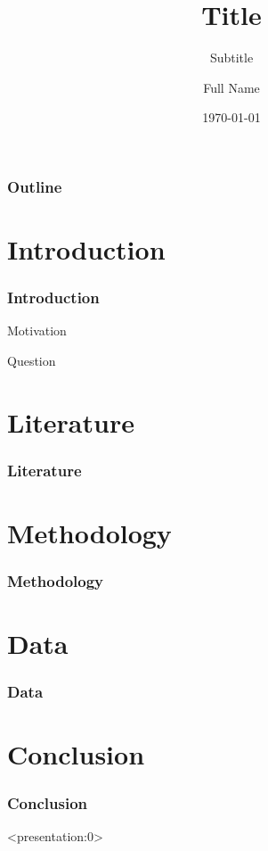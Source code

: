\documentclass[hyperref={pdfpagelabels=false}]{beamer}
\title[Short Title]{Title}
\subtitle{Subtitle}
\author[Last Name]{Full Name}
\institute[Inst Short]{Institute \\ \texttt{[image: usc\_shield.eps]}}
\date{\today}
\begin{document}

\frame{\titlepage}


\begin{frame}
\frametitle{Outline}
\tableofcontents
\end{frame}


\section{Introduction}

\begin{frame}
\frametitle{Introduction}

\begin{alertblock}{Motivation}
\end{alertblock}

\begin{block}{Question}
\end{block}

\end{frame}


\section{Literature}

\begin{frame}
\frametitle{Literature}

\end{frame}


\section{Methodology}

\begin{frame}
\frametitle{Methodology}

\end{frame}


\section{Data}

\begin{frame}
\frametitle{Data}

\end{frame}


\section{Conclusion}

\begin{frame}
\frametitle{Conclusion}

\end{frame}


\begin{frame}<presentation:0>
  
  
\end{frame}
\end{document}
